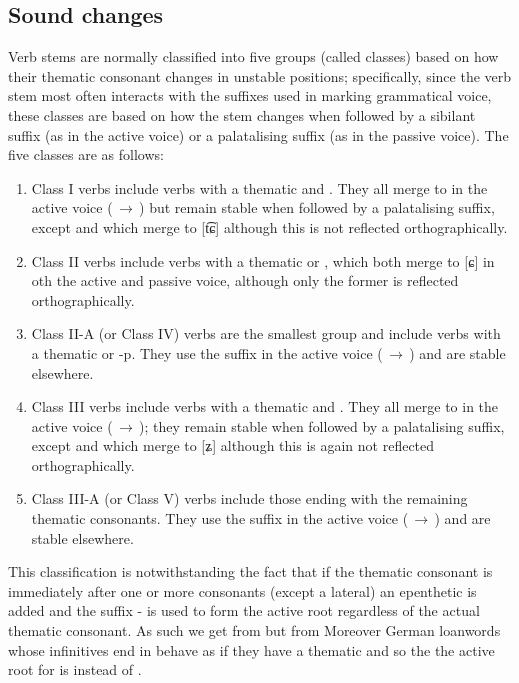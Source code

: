 \subsection{Sound changes}
Verb stems are normally classified into five groups (called {\sc classes}) based on how their thematic consonant changes in unstable positions; specifically, since the verb stem most often interacts with the suffixes used in marking grammatical voice, these classes are based on how the stem changes when followed by a sibilant suffix (as in the active voice) or a palatalising suffix (as in the passive voice). The five classes are as follows: 
\begin{enumerate}[nosep]
	\item Class I verbs include verbs with a thematic  and . They all merge to  in the active voice (\,$\rightarrow$\,) but remain stable when followed by a palatalising suffix, except  and  which merge to [t͡ɕ] although this is not reflected orthographically.
	\item Class II verbs include verbs with a thematic  or , which both merge to [ɕ] in oth the active and passive voice, although only the former is reflected orthographically. 
	\item Class II-A (or Class IV) verbs are the smallest group and include verbs with a thematic  or {-p}. They use the suffix  in the active voice (\,$\rightarrow$\,) and are stable elsewhere.
	\item Class III verbs include verbs with a thematic  and . They all merge to  in the active voice (\,$\rightarrow$\,); they remain stable when followed by a palatalising suffix, except  and  which merge to [ʑ] although this is again not reflected orthographically.
	\item Class III-A (or Class V) verbs include those ending with the remaining thematic consonants. They use the suffix  in the active voice (\,$\rightarrow$\,) and are stable elsewhere.
\end{enumerate}

This classification is notwithstanding the fact that if the thematic consonant is immediately after one or more consonants (except a lateral) an epenthetic  is added and the suffix - is used to form the active root regardless of the actual thematic consonant. As such we get  from  but  from  Moreover German loanwords whose infinitives end in  behave as if they have a thematic  and so the the active root for  is  instead of .

